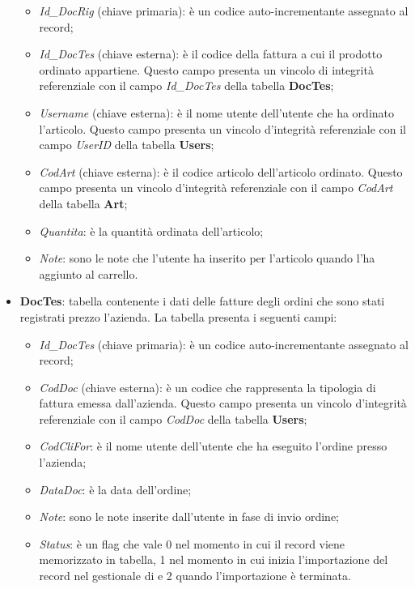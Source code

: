 \begin{itemize}
		\begin{itemize}
			\item \textit{Id\_DocRig} (chiave primaria): è un codice auto-incrementante assegnato al record; 
			\item \textit{Id\_DocTes} (chiave esterna): è il codice della fattura a cui il prodotto ordinato appartiene. Questo campo presenta un vincolo di integrità referenziale con il campo \textit{Id\_DocTes} della tabella \textbf{DocTes};
			\item \textit{Username} (chiave esterna): è il nome utente dell'utente che ha ordinato l'articolo. Questo campo presenta un vincolo d'integrità referenziale con il campo \textit{UserID} della tabella \textbf{Users};
			\item \textit{CodArt} (chiave esterna): è il codice articolo dell'articolo ordinato. Questo campo presenta un vincolo d'integrità referenziale con il campo \textit{CodArt} della tabella \textbf{Art};
			\item \textit{Quantita}: è la quantità ordinata dell'articolo;
			\item \textit{Note}: sono le note che l'utente ha inserito per l'articolo quando l'ha aggiunto al carrello.
		\end{itemize}
	\item \textbf{DocTes}: tabella contenente i dati delle fatture degli ordini che sono stati registrati prezzo l'azienda. La tabella presenta i seguenti campi:
		\begin{itemize}
			\item \textit{Id\_DocTes} (chiave primaria): è un codice auto-incrementante assegnato al record;
			\item \textit{CodDoc} (chiave esterna): è un codice che rappresenta la tipologia di fattura emessa dall'azienda. Questo campo presenta un vincolo d'integrità referenziale con il campo \textit{CodDoc} della tabella \textbf{Users};
			\item \textit{CodCliFor}: è il nome utente dell'utente che ha eseguito l'ordine presso l'azienda;
			\item \textit{DataDoc}: è la data dell'ordine;
			\item \textit{Note}: sono le note inserite dall'utente in fase di invio ordine;
			\item \textit{Status}: è un flag che vale 0 nel momento in cui il record viene memorizzato in tabella, 1 nel momento in cui inizia l'importazione del record nel gestionale di \visione{} e 2 quando l'importazione è terminata.
		\end{itemize}

\end{itemize}

